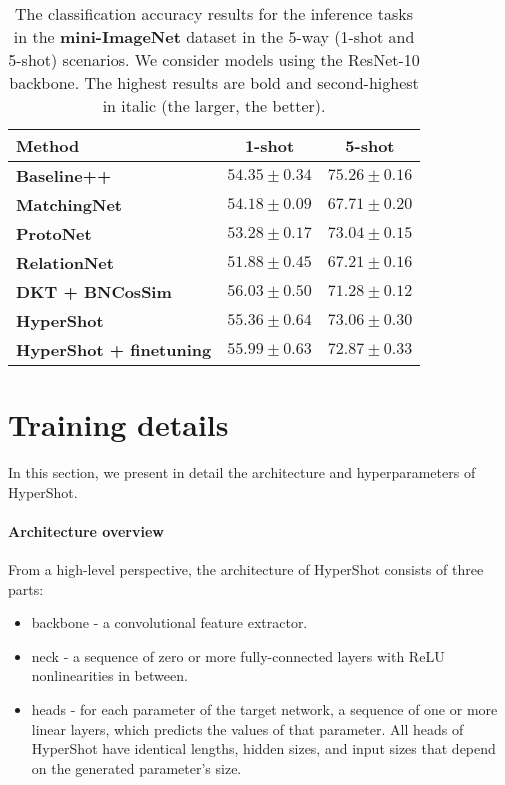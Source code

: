 \documentclass[nohyperref]{article}
\def\our{HyperShot}
\theoremstyle{plain}
\theoremstyle{definition}
\theoremstyle{remark}
\begin{document}
\begin{table*}[h!]
\centering
\caption{
    The classification accuracy results for the inference tasks in the \textbf{mini-ImageNet} dataset in the 5-way (1-shot and 5-shot) scenarios. We consider models using the ResNet-10 backbone. The highest results are bold and second-highest in italic (the larger, the better).}
\label{tab:miniresnet}
\begin{tabular}{lcc}
\toprule
\textbf{Method}    & \textbf{1-shot} & \textbf{5-shot} \\
\midrule
\textbf{Baseline++}  \cite{chen2019closer}  & $54.35 \pm 0.34$ & $\mathbf{75.26 \pm 0.16}$ \\
\textbf{MatchingNet} \cite{vinyals2016matching}   & $54.18 \pm 0.09$ & $67.71 \pm 0.20$ \\
\textbf{ProtoNet} \cite{snell2017prototypical}   & $53.28 \pm 0.17$ & $73.04 \pm 0.15$ \\
\textbf{RelationNet}  \cite{sung2018learning}  & $51.88 \pm 0.45$  & $67.21 \pm 0.16$ \\
\textbf{DKT + BNCosSim} \cite{patacchiola2020bayesian}   & $\mathbf{56.03 \pm 0.50}$ & $71.28 \pm 0.12$ \\
\midrule
\textbf{\our{}} & $55.36 \pm 0.64$ & $\mathit{73.06 \pm 0.30}$  \\
\textbf{\our{} + finetuning}   & $\mathit{55.99 \pm 0.63}$ &   $72.87 \pm 0.33 $ \\
\bottomrule
\end{tabular}
\end{table*}



\section{Training details}

In this section, we present in detail the architecture and hyperparameters of \our{}.

\paragraph{Architecture overview}

    From a high-level perspective, the architecture of \our{} consists of three parts:
    \begin{itemize}
        \item backbone - a convolutional feature extractor.
        \item neck - a sequence of zero or more fully-connected layers with ReLU nonlinearities in between.
        \item heads - for each parameter of the target network, a sequence of one or more linear layers, which predicts the values of that parameter. All heads of \our{} have identical lengths, hidden sizes, and input sizes that depend on the generated parameter's size.
    \end{itemize}
    
\end{document}
